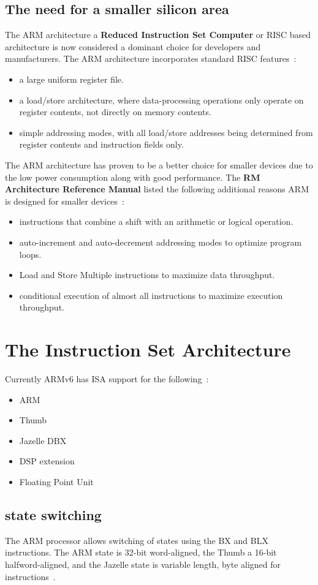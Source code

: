 \documentclass[11pt]{report}
\begin{document}
\subsection{The need for a smaller silicon area}
\begin{doublespace}
The ARM architecture a \textbf{Reduced Instruction Set Computer} or RISC based architecture is now considered a dominant choice for developers and manufacturers. The ARM architecture incorporates standard RISC features~\citep[A1-2]{referenceB}:
\end{doublespace}

\begin{itemize}
\item a large uniform register file.
\item a load/store architecture, where data-processing operations only operate on register contents, not directly on memory contents.
\item simple addressing modes, with all load/store addresses being determined from register contents and instruction fields only.
\end{itemize}
\begin{doublespace}
The ARM architecture has proven to be a better choice for smaller devices due to the low power consumption along with good performance. The \textbf{RM Architecture Reference Manual} listed the following additional reasons ARM is designed for smaller devices~\citep[A1-2]{referenceB}:
\end{doublespace}
\begin{itemize}
\item instructions that combine a shift with an arithmetic or logical operation.
\item auto-increment and auto-decrement addressing modes to optimize program loops.
\item Load and Store Multiple instructions to maximize data throughput.
\item conditional execution of almost all instructions to maximize execution throughput.
\end{itemize}
\section{The Instruction Set Architecture}
Currently ARMv6 has ISA support for the following~\citep{ARM1176}:
\begin{itemize}
\item ARM
\item Thumb\textregistered
\item Jazelle DBX\textregistered
\item DSP extension
\item Floating Point Unit
\end{itemize}
\begin{doublespace}
\subsection{state switching}
The ARM processor allows switching of states using the BX and BLX instructions. The ARM state is 32-bit word-aligned, the Thumb a 16-bit halfword-aligned, and the Jazelle state is variable length, byte aligned for instructions~\citep[2-12]{arm1176jzf-s}.
\end{doublespace}
\end{document}

